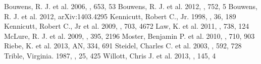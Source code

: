 \begin{thebibliography}{}
 Bouwens, R. J. et al. 2006, \apj, 653, 53	
 Bouwens, R. J. et al. 2012, \apj, 752, 5 	
 Bouwens, R. J. et al. 2012, arXiv:1403.4295
 Kennicutt, Robert C., Jr. 1998, \araa, 
36, 189		%
 Kennicutt, Robert C., Jr et al. 2009, \apj, 
703, 4672	%
 Law, K. et al. 2011, \apj, 738, 124
 McLure, R. J. et al. 2009, \mnras, 395, 2196	
 Moster, Benjamin P. et al. 2010, \apj, 710, 
903 
 Riebe, K. et al. 2013, AN, 334, 691 		
 Steidel, Charles C. et al. 2003, \apj, 592, 
728 		%
 Trible, Virginia. 1987, \araa, 25, 425
 Willott, Chris J. et al. 2013, \aj, 145, 4	


\end{thebibliography}
